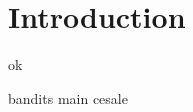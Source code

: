 \documentclass[
    10pt,
    b5paper,
    twoside,
    openright,
]{report} %
\begin{document}



\setcounter{tocdepth}{1}
\tableofcontents
\cleardoublepage

\chapter{Introduction}
ok \cite{grover1996}

{bandits}
{main}
{cesale}


\begin{sloppypar}
    \printbibliography[
        heading=bibintoc,
        title={References}
    ]
\end{sloppypar}
\end{document}

